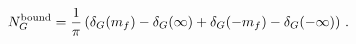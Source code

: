 \begin{equation}
N^{\rm bound}_G = \frac{1}{\pi} \left( \delta_G(m_f) - 
\delta_G(\infty) + \delta_G(-m_f) - \delta_G(-\infty) \right) \, . 
\end{equation}

